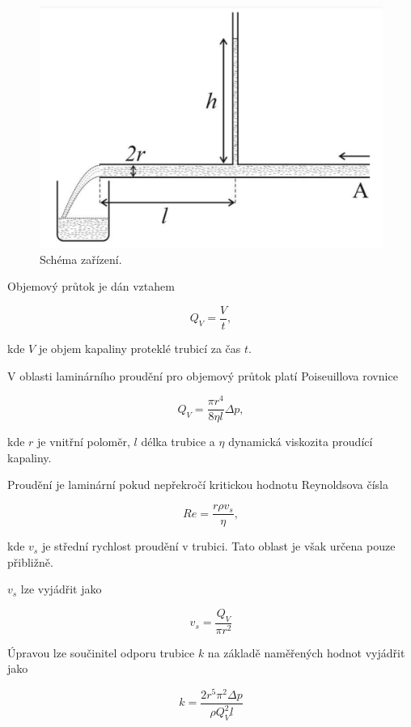     \begin{figure}[h]
        \centering
        \includegraphics[width=0.5\linewidth]{01 - Studium proudění viskózní kapaliny trubicemi kruhového průřezu//Protokol//img/Schéma.png}
        \caption{Schéma zařízení.}
        \label{fig:schema}
    \end{figure}

    Objemový průtok je dán vztahem

    \begin{equation}
        Q_V = \frac{V}{t},
    \end{equation}

    kde \(V\) je objem kapaliny proteklé trubicí za čas \(t\).

    V oblasti laminárního proudění pro objemový průtok platí Poiseuillova rovnice

    \begin{equation}
        Q_V = \frac{\pi r^4}{8\eta l}\Delta p,
    \end{equation}

    kde \(r\) je vnitřní poloměr, \(l\) délka trubice a \(\eta\) dynamická viskozita proudící kapaliny.

    Proudění je laminární pokud nepřekročí kritickou hodnotu Reynoldsova čísla

    \begin{equation}
        Re = \frac{r\rho v_s}{\eta},
    \end{equation}

    kde \(v_s\) je střední rychlost proudění v trubici. Tato oblast je však určena pouze přibližně.

    \(v_s\) lze vyjádřit jako

    \begin{equation}
        v_s = \frac{Q_V}{\pi r^2}
    \end{equation}

    Úpravou lze součinitel odporu trubice \(k\) na základě naměřených hodnot vyjádřit jako

    \begin{equation}
        k = \frac{2r^5\pi^2\Delta p}{\rho Q_V^2 l}
    \end{equation}

